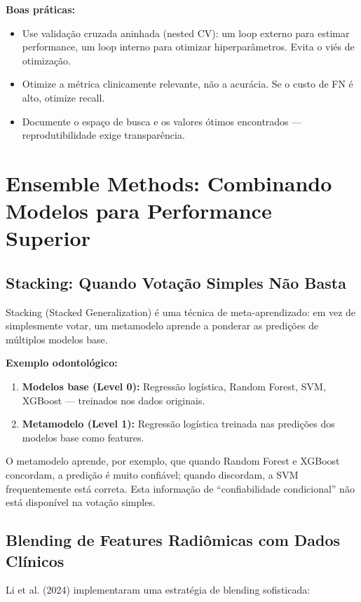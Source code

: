 \textbf{Boas práticas:}
\begin{itemize}
    \item Use validação cruzada aninhada (nested CV): um loop externo para estimar performance, um loop interno para otimizar hiperparâmetros. Evita o viés de otimização.
    \item Otimize a métrica clinicamente relevante, não a acurácia. Se o custo de FN é alto, otimize recall.
    \item Documente o espaço de busca e os valores ótimos encontrados — reprodutibilidade exige transparência.
\end{itemize}

\section{Ensemble Methods: Combinando Modelos para Performance Superior}

\subsection{Stacking: Quando Votação Simples Não Basta}

Stacking (Stacked Generalization)  é uma técnica de meta-aprendizado: em vez de simplesmente votar, um metamodelo aprende a ponderar as predições de múltiplos modelos base.

\textbf{Exemplo odontológico:}
\begin{enumerate}
    \item \textbf{Modelos base (Level 0):} Regressão logística, Random Forest, SVM, XGBoost — treinados nos dados originais.
    \item \textbf{Metamodelo (Level 1):} Regressão logística treinada nas predições dos modelos base como features.
\end{enumerate}

O metamodelo aprende, por exemplo, que quando Random Forest e XGBoost concordam, a predição é muito confiável; quando discordam, a SVM frequentemente está correta. Esta informação de ``confiabilidade condicional'' não está disponível na votação simples.

\subsection{Blending de Features Radiômicas com Dados Clínicos}

Li et al. (2024) \cite{ODT-028} implementaram uma estratégia de blending sofisticada:

